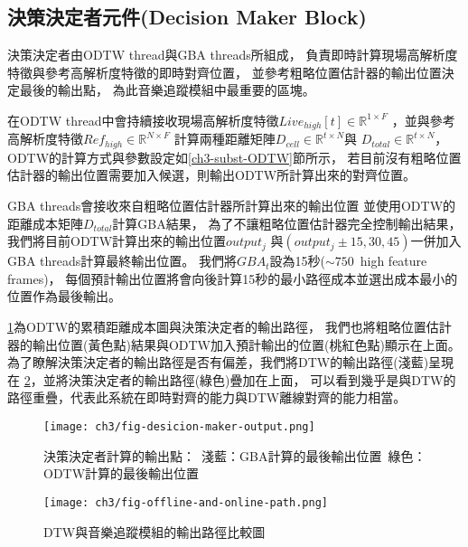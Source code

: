 \documentclass[class=NCU_thesis, crop=false]{standalone}
\begin{document}

\subsection{決策決定者元件(Decision Maker Block)} \label{ch3-subst-decision-maker}
決策決定者由ODTW thread與GBA threads所組成，
負責即時計算現場高解析度特徵與參考高解析度特徵的即時對齊位置，
並參考粗略位置估計器的輸出位置決定最後的輸出點，
為此音樂追蹤模組中最重要的區塊。

在ODTW thread中會持續接收現場高解析度特徵$Live_{high}[t] \in \mathbb{R}^{1 \times F}$
，並與參考高解析度特徵$Ref_{high} \in \mathbb{R}^{N \times F}$
計算兩種距離矩陣$D_{cell} \in \mathbb{R}^{t \times N}$與
$D_{total} \in \mathbb{R}^{t \times N}$，
ODTW的計算方式與參數設定如\ref{ch3-subst-ODTW}節所示，
若目前沒有粗略位置估計器的輸出位置需要加入候選，則輸出ODTW所計算出來的對齊位置。

GBA threads會接收來自粗略位置估計器所計算出來的輸出位置
並使用ODTW的距離成本矩陣$D_{total}$計算GBA結果，
為了不讓粗略位置估計器完全控制輸出結果，
我們將目前ODTW計算出來的輸出位置$output_j$
與$(output_j\pm 15, 30, 45)$一併加入GBA threads計算最終輸出位置。
我們將$GBA_{t}$設為15秒($\sim 750$\ high feature frames)，
每個預計輸出位置將會向後計算15秒的最小路徑成本並選出成本最小的位置作為最後輸出。

\cref{fig:fig-ch3-desicion-maker-output}為ODTW的累積距離成本圖與決策決定者的輸出路徑，
我們也將粗略位置估計器的輸出位置(黃色點)結果與ODTW加入預計輸出的位置(桃紅色點)顯示在上面。
為了瞭解決策決定者的輸出路徑是否有偏差，我們將DTW的輸出路徑(淺藍)呈現在
\cref{fig:fig-ch3-offline-and-online-path}，並將決策決定者的輸出路徑(綠色)疊加在上面，
可以看到幾乎是與DTW的路徑重疊，代表此系統在即時對齊的能力與DTW離線對齊的能力相當。
\begin{figure}[H]
    \centering
    \texttt{[image: ch3/fig-desicion-maker-output.png]}
    \caption{決策決定者計算的輸出點：\ 淺藍：GBA計算的最後輸出位置\ 綠色：ODTW計算的最後輸出位置}
    \label{fig:fig-ch3-desicion-maker-output}
\end{figure}
\begin{figure}[H]
    \centering
    \texttt{[image: ch3/fig-offline-and-online-path.png]}
    \caption{DTW與音樂追蹤模組的輸出路徑比較圖}
    \label{fig:fig-ch3-offline-and-online-path}
\end{figure}


\pagebreak
\end{document}
